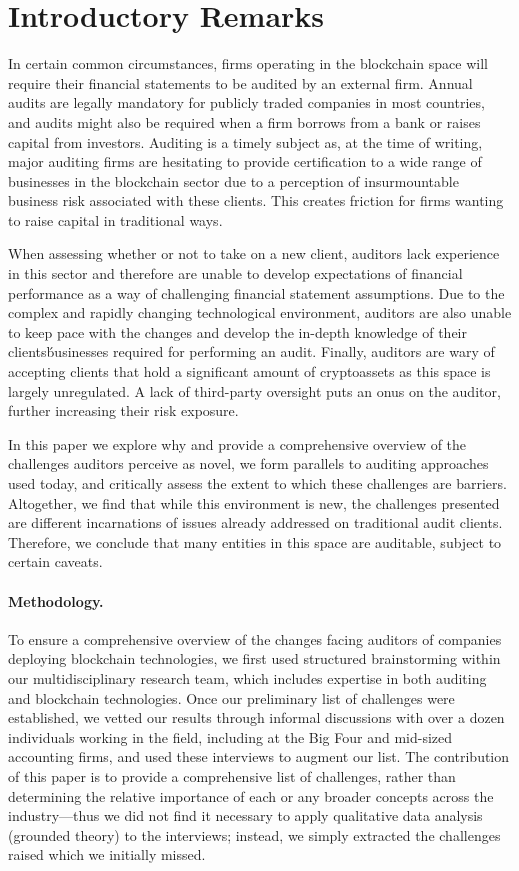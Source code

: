 \section{Introductory Remarks}

In certain common circumstances, firms operating in the blockchain space will require their financial statements to be audited by an external firm. Annual audits are legally mandatory for publicly traded companies in most countries, and audits might also be required when a firm borrows from a bank or raises capital from investors. Auditing is a timely subject as, at the time of writing, major auditing firms are hesitating to provide certification to a wide range of businesses in the blockchain sector due to a perception of insurmountable business risk associated with these clients.  This creates friction for firms wanting to raise capital in traditional ways. 

When assessing whether or not to take on a new client, auditors lack experience in this sector and therefore are unable to develop expectations of financial performance as a way of challenging financial statement assumptions. Due to the complex and rapidly changing technological environment, auditors are also unable to keep pace with the changes and develop the in-depth knowledge of their clients\' businesses required for performing an audit. Finally, auditors are wary of accepting clients that hold a significant amount of cryptoassets as this space is largely unregulated. A lack of third-party oversight puts an onus on the auditor, further increasing their risk exposure.  

In this paper we explore why and provide a comprehensive overview of the challenges auditors perceive as novel, we form parallels to auditing approaches used today, and critically assess the extent to which these challenges are barriers. Altogether, we find that while this environment is new, the challenges presented are different incarnations of issues already addressed on traditional audit clients. Therefore, we conclude that many entities in this space are auditable, subject to certain caveats. 


\paragraph{\textbf{Methodology.}} To ensure a comprehensive overview of the changes facing auditors of companies deploying blockchain technologies, we first used structured brainstorming within our multidisciplinary research team, which includes expertise in both auditing and blockchain technologies. Once our preliminary list of challenges were established, we vetted our results through informal discussions with over a dozen individuals working in the field, including at the Big Four and mid-sized accounting firms, and used these interviews to augment our list. The contribution of this paper is to provide a comprehensive list of challenges, rather than determining the relative importance of each or any broader concepts across the industry---thus we did not find it necessary to apply qualitative data analysis (\eg grounded theory) to the interviews; instead, we simply extracted the challenges raised which we initially missed.



